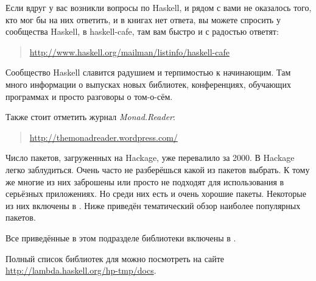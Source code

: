 
Если вдруг у вас возникли вопросы по Haskell, и рядом с вами не оказалось
того, кто мог бы на них ответить, и в книгах нет ответа, вы 
можете спросить у сообщества Haskell,
в haskell-cafe, там вам быстро и с радостью ответят:

\begin{quote}
\url{http://www.haskell.org/mailman/listinfo/haskell-cafe}
\end{quote}

Сообщество Haskell славится радушием и терпимостью 
к начинающим. Там много информации о выпусках новых библиотек,
конференциях, обучающих программах и просто разговоры о том-о-сём.

Также стоит отметить журнал \emph{Monad.Reader}:

\begin{quote}
\url{http://themonadreader.wordpress.com/}
\end{quote}

\newpage


Число пакетов, загруженных на Hackage, уже перевалило за 
2000. В Hackage легко заблудиться. 
Очень часто не разберёшься какой из пакетов
выбрать. К тому же многие из них заброшены или просто 
не подходят для использования в серьёзных приложениях. 
Но среди них есть и очень хорошие пакеты. Некоторые
из них включены в . 
Ниже приведён тематический обзор наиболее популярных пакетов.


Все приведённые в этом подразделе библиотеки включены
в .

Полный список библиотек для 
можно посмотреть на сайте \url{http://lambda.haskell.org/hp-tmp/docs}.

